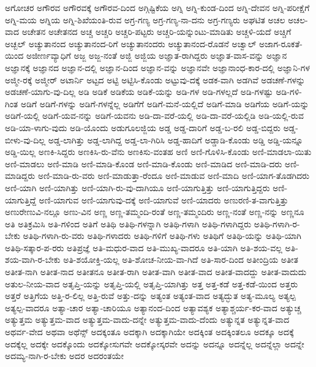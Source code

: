 {ಅಗೋಚರ
ಅಗೌರವ
ಅಗೌರವಕ್ಕೆ
ಅಗೌರವ-ದಿಂದ
ಅಗ್ಗಿಷ್ಟಿಕೆಯ
ಅಗ್ನಿ
ಅಗ್ನಿ-ಕುಂಡ-ದಿಂದ
ಅಗ್ನಿ-ದೇವನ
ಅಗ್ನಿ-ಪರೀಕ್ಷೆಗೆ
ಅಗ್ನಿ-ಮಯ
ಅಗ್ನಿಯ
ಅಗ್ನಿ-ಶಿಖೆಯಂತಿ-ರುವ
ಅಗ್ರ-ಗಣ್ಯ
ಅಗ್ರ-ಗಣ್ಯ-ನಾ-ದನು
ಅಗ್ರ-ಗಣ್ಯರು
ಅಘಟಿತ
ಅಚಲ
ಅಚಲ-ವಾದ
ಅಚೇತನ
ಅಚೇತನದ
ಅಚ್ಚ
ಅಚ್ಚರಿ
ಅಚ್ಚರಿ-ಪಟ್ಟರು
ಅಚ್ಚರಿ-ಯನ್ನುಂಟು-ಮಾಡಿತು
ಅಚ್ಚಳಿ-ಯದೆ
ಅಚ್ಚಿಗೆ
ಅಚ್ಬಲ್
ಅಚ್ಯುತಾನಂದ
ಅಚ್ಯುತಾನಂದ-ರಿಗೆ
ಅಚ್ಯುತಾನಂದರು
ಅಚ್ಯುತಾನಂದ-ರೊಡನೆ
ಅಚ್ವಾಲ್
ಅಜಾಗ-ರೂಕತೆ-ಯಿಂದ
ಅಜೀರ್ಣವ್ಯಾಧಿಗೆ
ಅಜ್ಜ
ಅಜ್ಜ-ನಂತೆ
ಅಜ್ಜಿ
ಅಜ್ಜಿಯ
ಅಜ್ಞಾತ-ರಾಗಿದ್ದರು
ಅಜ್ಞಾತ-ವಾಸ-ವನ್ನು
ಅಜ್ಞಾನ
ಅಜ್ಞಾನಕ್ಕೆ
ಅಜ್ಞಾನದ
ಅಜ್ಞಾನ-ದಲ್ಲಿ
ಅಜ್ಞಾನ-ದಿಂದ
ಅಜ್ಞಾನ-ವನ್ನು
ಅಜ್ಞಾನವೇ
ಅಜ್ಞಾನಾಂಧ-ಕಾರ-ದಲ್ಲಿ
ಅಜ್ಞಾನಿ-ಗಳ
ಅಜ್ಮೀ-ರಕ್ಕೆ
ಅಜ್ಮೀರ್
ಅಟಾರ್ನಿ
ಅಟ್ಟದ
ಅಟ್ಟಿ
ಅಟ್ಟಿಸಿ-ಕೊಂಡು
ಅಟ್ಟುವು-ದಕ್ಕೆ
ಅಡಕ-ವಾಗಿ
ಅಡಗಿವೆ
ಅಡಚಣೆ-ಗಳನ್ನು
ಅಡಚಣೆ-ಯಾಗು-ವು-ದಿಲ್ಲ
ಅಡಿ
ಅಡಿಕೆ
ಅಡಿಕೆಯ
ಅಡಿಕೆ-ಯನ್ನು
ಅಡಿ-ಗಳ
ಅಡಿ-ಗಳಲ್ಲದೆ
ಅಡಿ-ಗಳಷ್ಟು
ಅಡಿ-ಗಳಿ-ಗಿಂತ
ಅಡಿಗೆ
ಅಡಿಗೆ-ಗಳನ್ನು
ಅಡಿಗೆ-ಗಳನ್ನೆಲ್ಲ
ಅಡಿಗೆಗೆ
ಅಡಿಗೆ-ಮನೆ-ಯಲ್ಲಿದೆ
ಅಡಿಗೆ-ಮಾಡಿ
ಅಡಿಗೆಯ
ಅಡಿಗೆ-ಯನ್ನು
ಅಡಿಗೆ-ಯಲ್ಲಿ
ಅಡಿಗೆ-ಯವ-ನನ್ನು
ಅಡಿಗೆ-ಯವನು
ಅಡಿ-ದಾ-ವರೆ-ಯಲ್ಲಿ
ಅಡಿ-ದಾ-ವರೆ-ಯಲ್ಲಿಡಿ
ಅಡಿ-ಯಲ್ಲಿ-ರುವ
ಅಡಿ-ಯಾ-ಳಾಗು-ವುದು
ಅಡಿ-ಯೊಂದು
ಅಡುಗೂಲಜ್ಜಿಯ
ಅಡ್ಡ
ಅಡ್ಡ-ದಾರಿಗೆ
ಅಡ್ಡ-ಬ-ರಲಿ
ಅಡ್ಡ-ಬಿದ್ದರು
ಅಡ್ಡ-ಬೀಳು-ವು-ದಿಲ್ಲ
ಅಡ್ಡ-ಲಾಗಿತ್ತು
ಅಡ್ಡ-ಲಾಗಿದ್ದ
ಅಡ್ಡ-ಲಾ-ಗಿರಿಸಿ
ಅಡ್ಡ-ಹಾದಿಗೆ
ಅಡ್ಡಾಡಿ-ಕೊಂಡು
ಅಡ್ಡಿ
ಅಡ್ಡಿ-ಯನ್ನೂ
ಅಡ್ಡಿ-ಯಿಲ್ಲ
ಅಣಕಿ-ಸಿದ್ದರು
ಅಣಕಿಸಿ-ರು-ವೆನು
ಅಣಕಿಸು-ವಂತಹ
ಅಣಿ
ಅಣಿ-ಗೊಳಿಸಿ-ಕೊಂಡು
ಅಣಿ-ಮಾಡಲಾ-ಯಿತು
ಅಣಿ-ಮಾಡಲು
ಅಣಿ-ಮಾಡಿ
ಅಣಿ-ಮಾಡಿ-ಕೊಂಡ
ಅಣಿ-ಮಾಡಿ-ಕೊಂಡು
ಅಣಿ-ಮಾಡಿದ
ಅಣಿ-ಮಾಡಿ-ದರು
ಅಣಿ-ಮಾಡಿದ್ದರು
ಅಣಿ-ಮಾಡಿ-ರು-ವರು
ಅಣಿ-ಮಾಡುತ್ತಾ-ರೆಂದೂ
ಅಣಿ-ಮಾಡುವ
ಅಣಿ-ಮಾದಿ
ಅಣಿ-ಯಾಗ-ತೊಡಗಿದರು
ಅಣಿ-ಯಾಗಿ
ಅಣಿ-ಯಾಗಿತ್ತು
ಅಣಿ-ಯಾಗಿ-ರು-ವು-ದಾಗಿಯೂ
ಅಣಿ-ಯಾಗುತ್ತಿತ್ತು
ಅಣಿ-ಯಾಗುತ್ತಿದ್ದರು
ಅಣಿ-ಯಾಗುತ್ತಿದ್ದೆ
ಅಣಿ-ಯಾಗುವ
ಅಣಿ-ಯಾಗುವು-ದಕ್ಕೆ
ಅಣಿ-ಯಾಗುವೆ
ಅಣಿ-ಯಾದರು
ಅಣುರಣಿ-ತ-ವಾಗುತ್ತಿತ್ತು
ಅಣುರೇಣುವಿ-ನಲ್ಲೂ
ಅಣು-ವಿನ
ಅಣ್ಣ
ಅಣ್ಣ-ತಮ್ಮಂದಿ-ರಂತೆ
ಅಣ್ಣ-ತಮ್ಮಂದಿರು
ಅಣ್ಣ-ನಂತೆ
ಅಣ್ಣ-ನನ್ನು
ಅಣ್ಣನೂ
ಅತಿ
ಅತಿಕ್ರಮಿಸಿ
ಅತಿ-ಗಳಿಂದ
ಅತಿಗೆ
ಅತಿಥಿ
ಅತಿಥಿ-ಗಳನ್ನಾಗಿ
ಅತಿಥಿ-ಗಳಾಗಿ
ಅತಿಥಿ-ಗಳಾಗಿದ್ದರು
ಅತಿಥಿ-ಗಳಾಗಿ-ರ-ಬೇಕು
ಅತಿಥಿ-ಗಳಾಗಿ-ರು-ವರು
ಅತಿಥಿ-ಗಳಾದರು
ಅತಿಥಿ-ಗಳಿಗೆ
ಅತಿಥಿ-ಗಳು
ಅತಿಥಿಗೆ
ಅತಿಥಿ-ಯನ್ನು
ಅತಿಥಿ-ಯಾಗಿ
ಅತಿಥಿ-ಸತ್ಕಾರ-ಪ-ರರು
ಅತಿಪ್ರಜ್ಞೆ
ಅತಿ-ಮಧುರ-ವಾದ
ಅತಿ-ಮುಖ್ಯ-ವಾದರೂ
ಅತಿ-ಯಾಗಿ
ಅತಿ-ಶಯ-ವಲ್ಲ
ಅತಿ-ಶಯ-ವಾಗಿ-ರ-ಬೇಕು
ಅತಿ-ಶಯೋಕ್ತಿ-ಯಲ್ಲ
ಅತಿ-ಶೋಚ-ನೀಯ-ವಾ-ಗಿದೆ
ಅತಿ-ಸಾರ-ದಿಂದ
ಅತೀಂದ್ರಿಯ
ಅತೀತ
ಅತೀತ-ನಾಗಿ
ಅತೀತ-ನಾದ
ಅತೀತನೂ
ಅತೀತ-ರಾಗಿ
ಅತೀತ-ವಾಗಿ
ಅತೀತ-ವಾದ
ಅತೀತ-ವಾದದ್ದು
ಅತೀತ-ವಾದುದು
ಅತುಲ-ನೀಯ-ವಾದ
ಅತೃಪ್ತಿ-ಯನ್ನು
ಅತೃಪ್ತಿ-ಯಲ್ಲಿ
ಅತೃಪ್ತಿ-ಯಾಗಿತ್ತು
ಅತ್ತ
ಅತ್ತ-ಕಡೆ
ಅತ್ತ-ಕಡೆ-ಯಿಂದ
ಅತ್ತರು
ಅತ್ತರೆ
ಅತ್ತಿಗೆಯ
ಅತ್ತಿ-ರ-ಲಿಲ್ಲ
ಅತ್ತಿ-ರುವೆ
ಅತ್ತು-ದನ್ನು
ಅತ್ಯಂತ
ಅತ್ಯಂತ-ವಾದ
ಅತ್ಯದ್ಭುತ
ಅತ್ಯ-ಮೂಲ್ಯ
ಅತ್ಯಲ್ಪ
ಅತ್ಯಲ್ಪ-ವಾದರೂ
ಅತ್ಯಾ-ಚಾರ
ಅತ್ಯಾ-ಚಾರಿಯೂ
ಅತ್ಯಾನಂದ-ದಿಂದ
ಅತ್ಯಾವಶ್ಯಕ
ಅತ್ಯಾಶ್ಚರ್ಯ-ಕರ-ವಾದ
ಅತ್ಯುಚ್ಚ
ಅತ್ಯುತ್ತಮ
ಅತ್ಯುತ್ತಮ-ವಾದ
ಅತ್ಯುತ್ತಮ-ವಾದು-ದನ್ನೇ
ಅತ್ಯುತ್ತಮ-ವಾದು-ದೆಂದು
ಅತ್ಯುನ್ನತ
ಅತ್ಯುನ್ನತ-ವಾದ
ಅಥರ್ವ-ವೇದ
ಅಥವಾ
ಅಥೆನ್ಸ್
ಅದಕ್ಕಂತೂ
ಅದಕ್ಕಾಗಿ
ಅದಕ್ಕಾಗಿಯೇ
ಅದಕ್ಕಿಂತ
ಅದಕ್ಕಿಂತಲೂ
ಅದಕ್ಕೂ
ಅದಕ್ಕೆ
ಅದಕ್ಕೆಲ್ಲ
ಅದಕ್ಕೇ
ಅದಕ್ಕೊಂದು
ಅದಕ್ಕೋಸುಗವೇ
ಅದಕ್ಕೋಸ್ಕರವೇ
ಅದನ್ನು
ಅದನ್ನೂ
ಅದನ್ನೆಲ್ಲ
ಅದನ್ನೆಲ್ಲಾ
ಅದನ್ನೇ
ಅದಮ್ಯ-ನಾಗಿ-ರ-ಬೇಕು
ಅದರ
ಅದರಂತಯೇ
}
